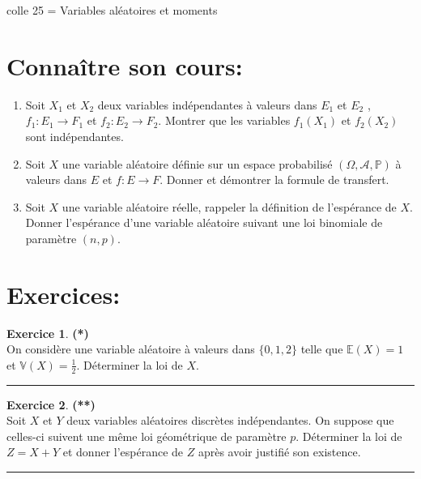 \documentclass[a4paper,11pt]{article}
\theoremstyle{definition}
\newtheorem{exo}{Exercice} %
\begin{document}
	
	
	\begin{center}
		\Large \sc colle 25 = Variables aléatoires et moments
	\end{center}
\raggedright

\section*{Connaître son cours:}
\begin{enumerate}
	\item Soit $X_1$ et $X_2$ deux variables indépendantes à valeurs dans $E_1$ et $E_2$ , $f_1 : E_1 \to F_1$ et $f_2 : E_2 \to F_2 $. Montrer que les variables $f_1 (X_1 )$ et $f_2 (X_2 )$ sont indépendantes.
	\item Soit $X$ une variable aléatoire définie sur un espace probabilisé $(\Omega,\mathcal{A},\mathbb{P})$ à valeurs dans $E$ et $f : E \to F$. Donner et démontrer la formule de transfert.
	\item Soit $X$ une variable aléatoire réelle, rappeler la définition de l'espérance de $X$. Donner l'espérance d'une variable aléatoire suivant une loi binomiale de paramètre $(n,p)$.
	
\end{enumerate} 

\section*{Exercices:} 

\begin{exo}\textbf{(*)}\quad\\[0.15cm]%
	On considère une variable aléatoire à valeurs dans $\{0, 1, 2\}$ telle que $\mathbb E(X ) = 1$ et $\mathbb V(X ) = \frac{1}{2}$. 
	Déterminer la loi de $X$.
	
	\centering
	\rule{1\linewidth}{0.6pt}
\end{exo}	

\begin{exo}\textbf{(**)}\quad\\[0.15cm]%
	
	Soit $X$ et $Y$ deux variables aléatoires discrètes indépendantes.
	On suppose que celles-ci suivent une même loi géométrique de paramètre $p$.
	Déterminer la loi de $Z=X+Y$ et donner l'espérance de $Z$ après avoir justifié son existence.
	
	\centering
	\rule{1\linewidth}{0.6pt}
\end{exo}
\end{document}
